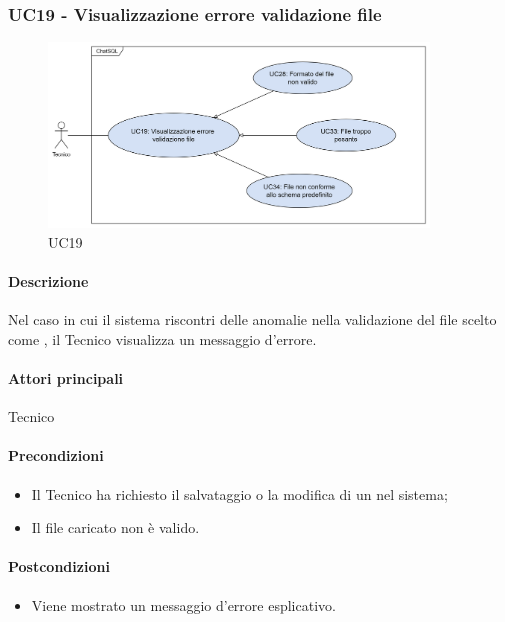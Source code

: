 \subsubsection{UC19 - Visualizzazione errore validazione file}\label{UC19}

\begin{figure}[H]
  \centering
  \includegraphics[width=0.90\textwidth]{assets/uc19.png}
  \caption{UC19}
\end{figure}

\paragraph*{Descrizione}
Nel caso in cui il sistema riscontri delle anomalie nella validazione del file scelto come , il Tecnico visualizza un messaggio d'errore.

\paragraph*{Attori principali}
Tecnico

\paragraph*{Precondizioni}
\begin{itemize}
  \item Il Tecnico ha richiesto il salvataggio o la modifica di un  nel sistema;
  \item Il file caricato non è valido.
\end{itemize}

\paragraph*{Postcondizioni}
\begin{itemize}
  \item Viene mostrato un messaggio d'errore esplicativo.
\end{itemize}

